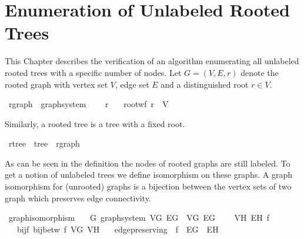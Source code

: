 \chapter{Enumeration of Unlabeled Rooted Trees}\label{chapter:rootred_tree_enum}

This Chapter describes the verification of an algorithm enumerating all unlabeled rooted trees with a specific number of nodes.
Let $G = (V,E,r)$ denote the rooted graph with vertex set $V$, edge set $E$ and a distinguished root $r \in V$.

\begin{isabellebox}
\isamarkupfalse%
\ rgraph\ {\isacharequal}{\kern0pt}\ graph{\isacharunderscore}{\kern0pt}system\ {\isacharplus}{\kern0pt}\isanewline
\ \ \ r\isanewline
\ \ \ root{\isacharunderscore}{\kern0pt}wf{\isacharcolon}{\kern0pt}\ {\isachardoublequoteopen}r\ {\isasymin}\ V{\isachardoublequoteclose}
\end{isabellebox}

Similarly, a rooted tree is a tree with a fixed root.

\begin{isabellebox}
    \isamarkupfalse%
    \ rtree\ {\isacharequal}{\kern0pt}\ tree\ {\isacharplus}{\kern0pt}\ rgraph
\end{isabellebox}

As can be seen in the definition the nodes of rooted graphs are still labeled.
To get a notion of unlabeled trees we define isomorphism on these graphs.
A graph isomorphism for (unrooted) graphs is a bijection between the vertex sets of two graph which preserves edge connectivity.

\begin{isabellebox}
\isamarkupfalse%
\ graph{\isacharunderscore}{\kern0pt}isomorphism\ {\isacharequal}{\kern0pt}\isanewline
\ \ G{\isacharcolon}{\kern0pt}\ graph{\isacharunderscore}{\kern0pt}system\ V\isactrlsub G\ E\isactrlsub G\ \ V\isactrlsub G\ E\isactrlsub G\ {\isacharplus}{\kern0pt}\isanewline
\ \ \ V\isactrlsub H\ E\isactrlsub H\ f\isanewline
\ \ \ bij{\isacharunderscore}{\kern0pt}f{\isacharcolon}{\kern0pt}\ {\isachardoublequoteopen}bij{\isacharunderscore}{\kern0pt}betw\ f\ V\isactrlsub G\ V\isactrlsub H{\isachardoublequoteclose}\isanewline
\ \ \ edge{\isacharunderscore}{\kern0pt}preserving{\isacharcolon}{\kern0pt}\ {\isachardoublequoteopen}{\isacharparenleft}{\kern0pt}{\isacharparenleft}{\kern0pt}{\isacharbackquote}{\kern0pt}{\isacharparenright}{\kern0pt}\ f{\isacharparenright}{\kern0pt}\ {\isacharbackquote}{\kern0pt}\ E\isactrlsub G\ {\isacharequal}{\kern0pt}\ E\isactrlsub H{\isachardoublequoteclose}
\end{isabellebox}

